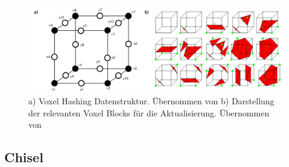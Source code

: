 \begin{figure}
  \centering
	\includegraphics[width=1.0\textwidth]{content/images/methods/marchingcubes.png} 
  \caption{a) Voxel Hashing Datenstruktur. Übernommen von \citet{niessner2013real} b) Darstellung der relevanten Voxel Blocks für die Aktualisierung. Übernommen von \citet{Klingensmith_2015_7924}}
  \label{fig:marchingcubes}
\end{figure}

\subsection{Chisel}


